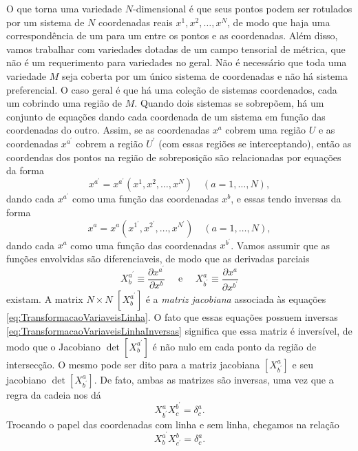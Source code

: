 O que torna uma variedade $N$-dimensional é que seus pontos podem ser rotulados por um sistema de $N$ coordenadas reais $x^1,x^2,\ldots,x^N$, de modo que haja uma correspondência de um para um entre os pontos e as coordenadas. Além disso, vamos trabalhar com variedades dotadas de um campo tensorial de métrica, que não é um requerimento para variedades no geral. Não é necessário que toda uma variedade $M$ seja coberta por um único sistema de coordenadas e não há sistema preferencial. O caso geral é que há uma coleção de sistemas coordenados, cada um cobrindo uma região de $M$. Quando dois sistemas se sobrepõem, há um conjunto de equações dando cada coordenada de um sistema em função das coordenadas do outro. Assim, se as coordenadas $x^a$ cobrem uma região $U$ e as coordenadas $x^{a^\prime}$ cobrem a região $U^\prime$ (com essas regiões se interceptando), então as coordendas dos pontos na região de sobreposição são relacionadas por equações da forma
\begin{equation}\label{eq:TransformacaoVariaveisLinha}
	x^{a^\prime}=x^{a^\prime}\left(x^{1}, x^{2}, \ldots, x^{N}\right) \quad(a=1, \ldots, N) ,
\end{equation}
dando cada $x^{a^\prime}$ como uma função das coordenadas $x^b$, e essas tendo inversas da forma
\begin{equation}\label{eq:TransformacaoVariaveisLinhaInversas}
	x^{a}=x^{a}\left(x^{1^\prime}, x^{2^\prime}, \ldots, x^{N^{\prime}}\right) \quad(a=1, \ldots, N),
\end{equation}
dando cada $x^a$ como uma função das coordenadas $x^{b^\prime}$. Vamos assumir que as funções envolvidas são diferenciaveis, de modo que as derivadas parciais
\[
	X_{b}^{a^{\prime}} \equiv \frac{\partial x^{a^{\prime}}}{\partial x^{b}} \quad \text { e } \quad X_{b^{\prime}}^{a} \equiv \frac{\partial x^{a}}{\partial x^{b^{\prime}}}
\]
existam. A matrix $N\times N$ $[X^{a^\prime}_b]$ é a \textit{matriz jacobiana} associada às equações \eqref{eq:TransformacaoVariaveisLinha}. O fato que essas equações possuem inversas \eqref{eq:TransformacaoVariaveisLinhaInversas} significa que essa matriz é inversível, de modo que o Jacobiano $\det[X^{a^\prime}_b]$ é não nulo em cada ponto da região de intersecção. O mesmo pode ser dito para a matriz jacobiana $[X^a_{b^\prime}]$ e seu jacobiano $\det[X^a_{b^\prime}]$. De fato, ambas as matrizes são inversas, uma vez que a regra da cadeia nos dá
\begin{equation}\label{eq:JacobianaInversa}
	X^a_{b^\prime}X^{b^\prime}_c=\delta^a_c.
\end{equation}
Trocando o papel das coordenadas com linha e sem linha, chegamos na relação
\begin{equation}\label{eq:JacobianaInversaLinha}
	X^{a^\prime}_bX^b_{c^\prime}=\delta^a_c .
\end{equation}

